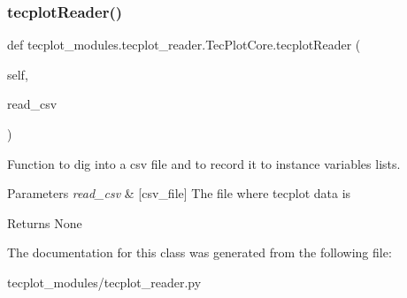 \subsubsection{\texorpdfstring{tecplot\+Reader()}{tecplotReader()}}
{\footnotesize\ttfamily def tecplot\+\_\+modules.\+tecplot\+\_\+reader.\+Tec\+Plot\+Core.\+tecplot\+Reader (\begin{DoxyParamCaption}\item[{}]{self,  }\item[{}]{read\+\_\+csv }\end{DoxyParamCaption})}



Function to dig into a csv file and to record it to instance variables lists. 


\begin{DoxyParams}{Parameters}
{\em read\+\_\+csv} & \mbox{[}csv\+\_\+file\mbox{]} The file where tecplot data is \\
\hline
\end{DoxyParams}
\begin{DoxyReturn}{Returns}
None 
\end{DoxyReturn}


The documentation for this class was generated from the following file\+:\begin{DoxyCompactItemize}
\item 
tecplot\+\_\+modules/tecplot\+\_\+reader.\+py\end{DoxyCompactItemize}
